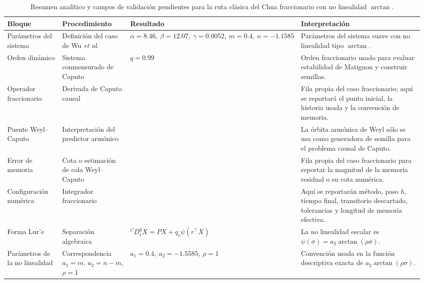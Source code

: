 \documentclass[journal]{IEEEtran}
\begin{document}
\begin{table}[htbp]
\centering
\scriptsize
\setlength{\tabcolsep}{3pt}
\renewcommand{\arraystretch}{1.12}
\caption{Resumen analítico y campos de validación pendientes para la ruta clásica del Chua fraccionario con no linealidad \(\arctan\).}
\label{tab:chua_frac_arctan_results_full}
\begin{adjustbox}{max width=\textwidth}
\begin{tabular}{@{}L{2.7cm}L{3.4cm}L{4.4cm}L{5.8cm}@{}}
\toprule
\textbf{Bloque} &
\textbf{Procedimiento} &
\textbf{Resultado} &
\textbf{Interpretación} \\
\midrule

Parámetros del sistema &
Definición del caso de Wu \emph{et al}. &
\(\alpha=8.46,\ \beta=12.07,\ \gamma=0.0052,\ m=0.4,\ n=-1.1585\) &
Parámetros del sistema suave con no linealidad tipo \(\arctan\). \\

Orden dinámico &
Sistema conmensurado de Caputo &
\(q=0.99\) &
Orden fraccionario usado para evaluar estabilidad de Matignon y construir semillas. \\

Operador fraccionario &
Derivada de Caputo causal &
 &
Fila propia del caso fraccionario; aquí se reportará el punto inicial, la historia usada y la convención de memoria. \\

Puente Weyl--Caputo &
Interpretación del predictor armónico &
 &
La órbita armónica de Weyl sólo se usa como generadora de semilla para el problema causal de Caputo. \\

Error de memoria &
Cota o estimación de cola Weyl--Caputo &
 &
Fila propia del caso fraccionario para reportar la magnitud de la memoria residual o su cota numérica. \\

Configuración numérica &
Integrador fraccionario &
 &
Aquí se reportarán método, paso \(h\), tiempo final, transitorio descartado, tolerancias y longitud de memoria efectiva. \\

Forma Lur'e &
Separación algebraica &
\({}^{C}D_t^qX=PX+q_v\psi(r^\top X)\) &
La no linealidad escalar es \(\psi(\sigma)=a_2\arctan(\rho\sigma)\). \\

Parámetros de la no linealidad &
Correspondencia \(a_1=m\), \(a_2=n-m\), \(\rho=1\) &
\(a_1=0.4,\ a_2=-1.5585,\ \rho=1\) &
Convención usada en la función descriptiva exacta de \(a_2\arctan(\rho\sigma)\). \\


\end{tabular}
\end{adjustbox}
\end{table}
\end{document}
